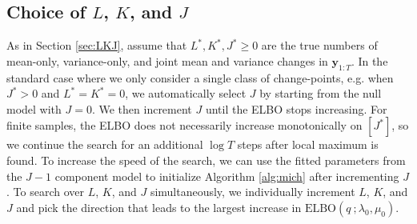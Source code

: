 \subsection{Choice of $L$, $K$, and $J$}
\label{app:LKJ-choice}

As in Section \ref{sec:LKJ}, assume that $L^*, K^*, J^* \geq 0$ are the true numbers of mean-only, variance-only, and joint mean and variance changes in $\mathbf{y}_{1:T}$. In the standard case where we only consider a single class of change-points, e.g. when $J^* > 0$ and $L^*=K^*=0$, we automatically select $J$ by starting from the null model with $J=0$. We then increment $J$ until the ELBO stops increasing. For finite samples, the ELBO does not necessarily increase monotonically on $[J^*]$, so we continue the search for an additional $\log T$ steps after local maximum is found. To increase the speed of the search, we can use the fitted parameters from the $J-1$ component model to initialize Algorithm \ref{alg:mich} after incrementing $J$. To search over $L$, $K$, and $J$ simultaneously, we individually increment $L$, $K$, and $J$ and pick the direction that leads to the largest increase in $\text{ELBO}(q\:;\lambda_0, \mu_0)$.

